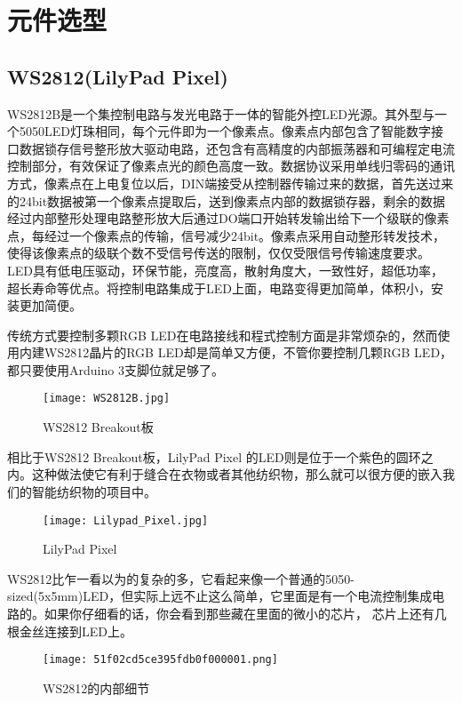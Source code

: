 \section{元件选型}


\subsection{WS2812(LilyPad Pixel)}

WS2812B是一个集控制电路与发光电路于一体的智能外控LED光源。其外型与一个5050LED灯珠相同，每个元件即为一个像素点。像素点内部包含了智能数字接口数据锁存信号整形放大驱动电路，还包含有高精度的内部振荡器和可编程定电流控制部分，有效保证了像素点光的颜色高度一致。数据协议采用单线归零码的通讯方式，像素点在上电复位以后，DIN端接受从控制器传输过来的数据，首先送过来的24bit数据被第一个像素点提取后，送到像素点内部的数据锁存器，剩余的数据经过内部整形处理电路整形放大后通过DO端口开始转发输出给下一个级联的像素点，每经过一个像素点的传输，信号减少24bit。像素点采用自动整形转发技术，使得该像素点的级联个数不受信号传送的限制，仅仅受限信号传输速度要求。LED具有低电压驱动，环保节能，亮度高，散射角度大，一致性好，超低功率，超长寿命等优点。将控制电路集成于LED上面，电路变得更加简单，体积小，安装更加简便。

传统方式要控制多颗RGB LED在电路接线和程式控制方面是非常烦杂的，然而使用内建WS2812晶片的RGB LED却是简单又方便，不管你要控制几颗RGB LED，都只要使用Arduino 3支脚位就足够了。


\begin{figure}[htbp]
\centering
\texttt{[image: WS2812B.jpg]}
\caption{WS2812 Breakout板} 
\label{2812}
\end{figure}

相比于WS2812 Breakout板，LilyPad Pixel 的LED则是位于一个紫色的圆环之内。这种做法使它有利于缝合在衣物或者其他纺织物，那么就可以很方便的嵌入我们的智能纺织物的项目中。

\begin{figure}[htbp]
\centering
\texttt{[image: Lilypad\_Pixel.jpg]}
\caption{LilyPad Pixel} 
\label{LilyPad}
\end{figure}



WS2812比乍一看以为的复杂的多，它看起来像一个普通的5050-sized(5x5mm)LED，但实际上远不止这么简单，它里面是有一个电流控制集成电路的。如果你仔细看的话，你会看到那些藏在里面的微小的芯片， 芯片上还有几根金丝连接到LED上。

\begin{figure}[htbp]
\centering
\texttt{[image: 51f02cd5ce395fdb0f000001.png]}
\caption{WS2812的内部细节} 
\label{WS}
\end{figure}

